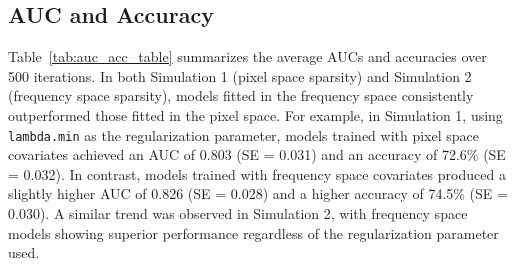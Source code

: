 \documentclass[12pt]{article}
\begin{document}
\subsection*{AUC and Accuracy}

Table~\ref*{tab:auc_acc_table} summarizes the average AUCs and accuracies over 500 iterations. In both Simulation 1 (pixel space sparsity) and Simulation 2 (frequency space sparsity), models fitted in the frequency space consistently outperformed those fitted in the pixel space. For example, in Simulation 1, using \texttt{lambda.min} as the regularization parameter, models trained with pixel space covariates achieved an AUC of 0.803 (SE = 0.031) and an accuracy of 72.6\% (SE = 0.032). In contrast, models trained with frequency space covariates produced a slightly higher AUC of 0.826 (SE = 0.028) and a higher accuracy of 74.5\% (SE = 0.030). A similar trend was observed in Simulation 2, with frequency space models showing superior performance regardless of the regularization parameter used.
\end{document}
